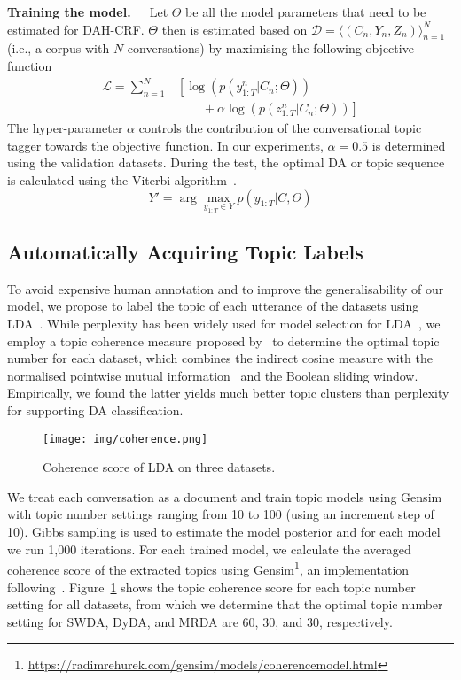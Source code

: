 \documentclass[11pt,a4paper]{article}
\begin{document}
\noindent\textbf{Training the model.}~~~Let $\Theta$ be all the model parameters that need to be estimated for DAH-CRF.  $\Theta$ then is estimated based on $\mathcal{D}=\langle(C_n, Y_n, Z_n)\rangle_{n=1}^N$ (i.e., a corpus with $N$ conversations) by maximising the following objective function
\begin{align}
    \mathcal{L} = \sum_{n=1} ^ { N }
&\left[\log \left( p \left( y _{1:T}^n | C_n;\Theta \right) \right) \right.
    \nonumber \\ 
 & 
    \left.
 		\qquad +  \alpha \log\left( p \left( z _{1:T}^n  | C_n;\Theta \right)\right) \right]
\end{align}
The hyper-parameter $\alpha $ controls the contribution of the conversational topic tagger towards the objective function. In our experiments, $\alpha = 0.5$ is determined using the validation datasets. During the test, the optimal DA or topic sequence is calculated using the Viterbi algorithm~\cite{viterbi1967error}.
\begin{equation}
    Y' = \arg \max _ { y_{1:T} \in Y } p ( y_{1:T} | C , \Theta )
\end{equation}


\subsection{Automatically Acquiring Topic Labels}

To avoid expensive human annotation and to improve the generalisability of our model, we propose to label the topic of each utterance of the datasets using LDA~\cite{blei2003latent}. 
While perplexity has been widely used for model selection for LDA~\cite{chenghua2011probabilistic,he2012online}, we employ a topic coherence measure proposed by~\cite{roder2015exploring} to determine the optimal topic number for each dataset, which combines the indirect cosine measure with the normalised pointwise mutual information~\cite[NPMI]{bouma2009normalized} and the Boolean sliding window. Empirically, we found the latter yields much better topic clusters than perplexity for supporting DA classification. 

\begin{figure}[tb]
\centering
  \texttt{[image: img/coherence.png]}
\caption{Coherence score of LDA on three datasets.}
  \label{fig:co_per_lda}
\end{figure}




We treat each conversation as a document and train topic models using Gensim with topic number settings ranging from 10 to 100 (using an increment step of 10).  Gibbs sampling is used to estimate the model posterior and for each model we run 1,000 iterations. For each trained model, we calculate the averaged coherence score of the extracted topics using Gensim\footnote{\url{https://radimrehurek.com/gensim/models/coherencemodel.html}}, an implementation following~\cite{roder2015exploring}. Figure~\ref{fig:co_per_lda} shows the topic coherence score for each topic number setting for all datasets, from which we determine that the optimal topic number setting for SWDA, DyDA, and MRDA are 60, 30, and 30, respectively. 
\end{document}
